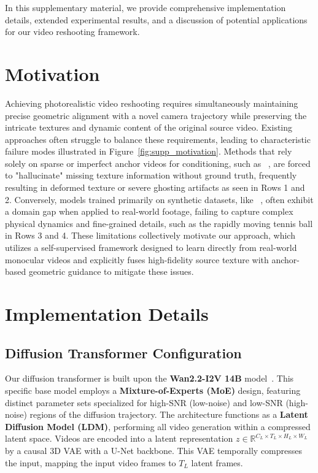 In this supplementary material, we provide comprehensive implementation details, extended experimental results, and a discussion of potential applications for our video reshooting framework.


\section{Motivation} 
\label{sec:supp_motivation}

Achieving photorealistic video reshooting requires simultaneously maintaining precise geometric alignment with a novel camera trajectory while preserving the intricate textures and dynamic content of the original source video. Existing approaches often struggle to balance these requirements, leading to characteristic failure modes illustrated in Figure~\ref{fig:supp_motivation}. Methods that rely solely on sparse or imperfect anchor videos for conditioning, such as \exfd{}~\cite{ex4d}, are forced to "hallucinate" missing texture information without ground truth, frequently resulting in deformed texture or severe ghosting artifacts as seen in Rows 1 and 2. Conversely, models trained primarily on synthetic datasets, like \recammaster{}~\cite{bai2025recammaster}, often exhibit a domain gap when applied to real-world footage, failing to capture complex physical dynamics and fine-grained details, such as the rapidly moving tennis ball in Rows 3 and 4. These limitations collectively motivate our approach, which utilizes a self-supervised framework designed to learn directly from real-world monocular videos and explicitly fuses high-fidelity source texture with anchor-based geometric guidance to mitigate these issues.


\section{Implementation Details}
\subsection{Diffusion Transformer Configuration}
\label{sec:diffusion_transformer_config}

Our diffusion transformer is built upon the \textbf{Wan2.2-I2V 14B} model~\cite{wan21}. This specific base model employs a \textbf{Mixture-of-Experts (MoE)} design, featuring distinct parameter sets specialized for high-SNR (low-noise) and low-SNR (high-noise) regions of the diffusion trajectory. The architecture functions as a \textbf{Latent Diffusion Model (LDM)}, performing all video generation within a compressed latent space. Videos are encoded into a latent representation $z \in \mathbb{R}^{C_L \times T_L \times H_L \times W_L}$ by a causal 3D VAE with a U-Net backbone. This VAE temporally compresses the input, mapping the input video frames to $T_L$ latent frames.

